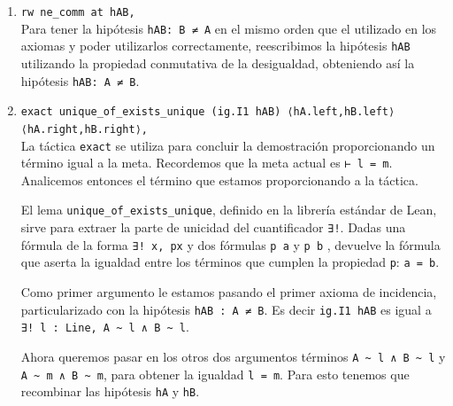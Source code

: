 \begin{enumerate}[label=L.\arabic*, topsep=0mm]
\begin{itemize}
		      \item La aplicación de la táctica \lstinline{rcases} nos permite, como
		            anteriormente, obtener un término concreto del cuantificador
		            existencial y además profundizar en las definiciones de
		            \lstinline{∃} y \lstinline{∧}, generando así tres hipótesis
		            separadas. Obtenemos por tanto las nuevas hipótesis
		            \begin{lstlisting}
B: Point 
hB: is_common_point B l m 
hAB: B ≠ A
\end{lstlisting}
	      \end{itemize}

	\item \lstinline{rw ne_comm at hAB,}\\[.5em] Para tener la hipótesis
	      \lstinline{hAB: B ≠ A} en el mismo orden que el utilizado en los axiomas y
	      poder utilizarlos correctamente, reescribimos la hipótesis \lstinline{hAB}
	      utilizando la propiedad conmutativa de la desigualdad, obteniendo así la
	      hipótesis \lstinline{hAB: A ≠ B}.

	\item \lstinline{exact unique_of_exists_unique (ig.I1 hAB) ⟨hA.left,hB.left⟩ ⟨hA.right,hB.right⟩,}\\[.5em]
	      La táctica \lstinline{exact} se utiliza para concluir la demostración
	      proporcionando un término igual a la meta. Recordemos que la meta actual
	      es \lstinline{⊢ l = m}. Analicemos entonces el término que estamos proporcionando a la táctica.

	      El lema \lstinline{unique_of_exists_unique}, definido en la librería
	      estándar de Lean, sirve para extraer la parte de unicidad del cuantificador
	      \lstinline{∃!}. Dadas una fórmula de la forma \lstinline{∃! x, px} y dos
	      fórmulas \lstinline{p a} y \lstinline{p b} , devuelve la fórmula que
	      aserta la igualdad entre los términos que cumplen la propiedad
	      \lstinline{p}: \lstinline{a = b}.

	      Como primer argumento le estamos pasando el primer axioma de incidencia,
	      particularizado con la hipótesis \lstinline{hAB : A ≠ B}. Es decir
	      \lstinline{ig.I1 hAB} es igual a\\ \lstinline{∃! l : Line, A ~ l ∧ B ~ l}.

	      Ahora queremos pasar en los otros dos argumentos términos
	      \lstinline{A ~ l ∧ B ~ l} y \lstinline{A ~ m ∧ B ~ m}, para obtener la
	      igualdad \lstinline{l = m}. Para esto tenemos que recombinar las hipótesis
	      \lstinline{hA} y \lstinline{hB}.


\end{enumerate}
